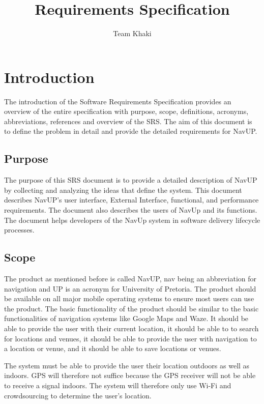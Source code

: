 \documentclass[11pt]{article}
\author{Team Khaki}
\title{Requirements Specification}
\begin{document}
	\setlength{\parskip}{6pt}
	
	
	
	\tableofcontents
	
	\newpage
		
	\section{Introduction}
	The introduction of the Software Requirements Specification provides an overview of the entire specification with purpose, scope, definitions, acronyms, abbreviations, references and overview of the SRS. The aim of this document is to define the problem in detail and provide the detailed requirements for NavUP.
	
	\subsection{Purpose}
	The purpose of this SRS document is to provide a detailed description of NavUP by collecting and analyzing the ideas that define the system. This document describes NavUP’s user interface, External Interface, functional, and performance requirements. The document also describes the users of NavUp and its functions. The document helps developers of the NavUp system in software delivery lifecycle processes. 

	\subsection{Scope}
	The product as mentioned before is called NavUP, nav being an abbreviation for navigation and UP is an acronym for University of Pretoria.
	The product should be available on all major mobile operating systems to ensure most users can use the product.
	The basic functionality of the product should be similar to the basic functionalities of navigation systems like Google Maps and Waze. It should be able to provide the user with their current location, it should be able to to search for locations and venues, it should be able to provide the user with navigation to a location or venue, and it should be able to save locations or venues. 
	
	The system must be able to provide the user their location outdoors as well as indoors. GPS will therefore not suffice because the GPS receiver will not be able to receive a signal indoors. The system will therefore only use Wi-Fi and crowdsourcing to determine the user's location.
	
\end{document}
